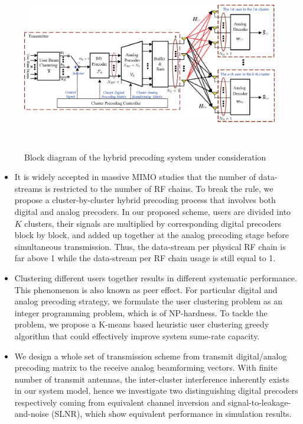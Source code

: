 \documentclass[conference]{IEEEtran}
\begin{document}
\begin{figure}[t]
\centering
\begin{minipage}[t]{0.7\linewidth}
	\includegraphics[width=5.6in,height=3in]{PPTFigure/BlockDiagonal.eps}
	\caption{Block diagram of the hybrid precoding system under consideration}\label{fig:BlockDiagram}
	\parbox{6.5cm}{\small \hspace{1.5cm} }
\end{minipage}
\end{figure}

\begin{itemize}
\item It is widely accepted in massive MIMO studies that the number of data-streams is restricted to the number of RF chains. To break the rule, we propose a cluster-by-cluster hybrid precoding process that involves both digital and analog precoders. In our proposed scheme, users are divided into $K$ clusters, their signals are multiplied by corresponding digital precoders block by block, and added up together at the analog precoding stage before simultaneous transmission. Thus, the data-stream per physical RF chain is far above 1 while the data-stream per RF chain usage is still equal to 1.
\item Clustering different users together results in different systematic performance. This phenomenon is also known as peer effect. For particular digital and analog precoding strategy, we formulate the user clustering problem as an integer programming problem, which is of NP-hardness. To tackle the problem, we propose a K-means based heuristic user clustering greedy algorithm that could effectively improve system sume-rate capacity.
\item We design a whole set of transmission scheme from transmit digital/analog precoding matrix to the receive analog beamforming vectors. With finite number of transmit antennas, the inter-cluster interference inherently exists in our system model, hence we investigate two distinguishing digital precoders respectively coming from equivalent channel inversion and signal-to-leakage-and-noise (SLNR), which show equivalent performance in simulation results.
\end{itemize}
\end{document}
